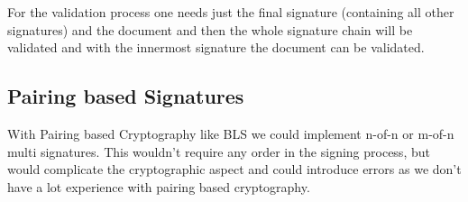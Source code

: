 For the validation process one needs just the final signature (containing all other signatures) and the document and then the whole signature chain will be validated and with the innermost signature the document can be validated.

\subsection{Pairing based Signatures}
With Pairing based Cryptography like \gls{BLS} we could implement n-of-n or m-of-n multi signatures.
This wouldn't require any order in the signing process, but would complicate the cryptographic aspect and could introduce errors as we don't have a lot experience with pairing based cryptography.